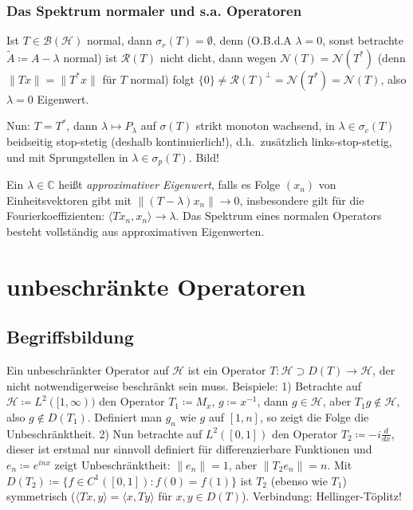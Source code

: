 \documentclass[11pt,a4paper]{scrartcl}
\newcommand{\C}{\mathbb{C}} %
\newcommand{\Hc}{\mathcal{H}}
\newcommand{\B}{\mathcal{B}}
\newcommand{\Nc}{\mathcal{N}}
\newcommand{\Rc}{\mathcal{R}}
\theoremstyle{plain}
\theoremstyle{definition}
\theoremstyle{remark}
\begin{document}
\subsubsection{Das Spektrum normaler und s.a. Operatoren}

Ist $T\in \B(\Hc)$ normal, dann $\sigma_r(T)=\emptyset$, denn (O.B.d.A $\lambda=0$, sonst betrachte $\tilde A \coloneqq A-\lambda$ normal) ist $\Rc(T)$ nicht dicht, dann wegen $\Nc(T)=\Nc(T^*)$ (denn $\|Tx\|=\|T^*x\|$ für $T$ normal) folgt $\{0\} \neq \Rc(T)^\bot = \Nc(T^*) = \Nc(T)$, also $\lambda=0$ Eigenwert.

Nun: $T=T^*$, dann $\lambda \mapsto P_\lambda$ auf $\sigma(T)$ strikt monoton wachsend, in $\lambda \in \sigma_c(T)$ beidseitig stop-stetig (deshalb kontinuierlich!), d.h.\ zusätzlich links-stop-stetig,  und mit Sprungstellen in $\lambda \in \sigma_p(T)$. Bild!

Ein $\lambda\in \C$ heißt \emph{approximativer Eigenwert}, falls es Folge $(x_n)$ von Einheitsvektoren gibt mit $\|(T-\lambda)x_n\| \to 0$, insbesondere gilt für die Fourierkoeffizienten: $\langle Tx_n, x_n \rangle \to \lambda$. Das Spektrum eines normalen Operators besteht vollständig aus approximativen Eigenwerten.

\section{unbeschränkte Operatoren}

\subsection{Begriffsbildung}

Ein unbeschränkter Operator auf $\Hc$ ist ein Operator $T:\Hc \supset D(T) \to \Hc$, der nicht notwendigerweise beschränkt sein muss. Beispiele: 1) Betrachte auf $\Hc\coloneqq L^2([1,\infty))$ den Operator $T_1\coloneqq M_x$, $g\coloneqq x^{-1}$, dann $g\in \Hc$, aber $T_1g\not\in \Hc$, also $g\not\in D(T_1)$. Definiert man $g_n$ wie $g$ auf $[1,n]$, so zeigt die Folge die Unbeschränktheit.  2) Nun betrachte auf $L^2([0,1])$ den Operator $T_2\coloneqq -i \frac{d}{dx}$, dieser ist erstmal nur sinnvoll definiert für differenzierbare Funktionen und $e_n\coloneqq e^{inx}$ zeigt Unbeschränktheit: $\|e_n\|=1$, aber $\|T_2 e_n\|=n$. Mit $D(T_2)\coloneqq \{f\in C^1([0,1]): f(0)=f(1) \}$ ist $T_2$ (ebenso wie $T_1$) symmetrisch ($\langle Tx,y\rangle = \langle x, Ty \rangle$ für $x,y\in D(T)$). Verbindung: Hellinger-Töplitz!
\end{document}
